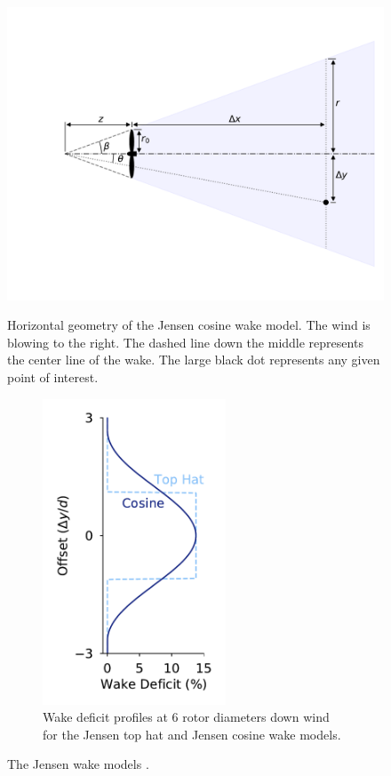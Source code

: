 \documentclass[journal abbreviation, manuscript]{copernicus}
\begin{document}
	\begin{figure}[h!]
		\centering
		\begin{subcaption}[t]{0.6\textwidth}
			\centering
			\includegraphics[width=\textwidth, trim={3cm 0cm 0cm 0cm}, clip]{wake_model_visualizations/jensen_diagram}
			\caption{Horizontal geometry of the Jensen cosine wake model. The wind is blowing to the right. The dashed line down the middle represents the center line of the wake. The large black dot represents any given point of interest.}
			\label{fig:JensenDiagrams}
		\end{subcaption}\hspace{1pc}
		\begin{subfigure}[t]{0.35\textwidth}
			\centering
			\includegraphics[width=0.6\textwidth, trim={1.05cm 0cm 1.05cm 0cm}]{wake_model_visualizations/jensen_profiles}
			\caption{Wake deficit profiles at 6 rotor diameters down wind for the Jensen top hat and Jensen cosine wake models.}
			\label{fig:JensenProfiles}
		\end{subfigure}
		\caption{The Jensen wake models \cite{jensen1983}.}
	\end{figure}
	
\end{document}
